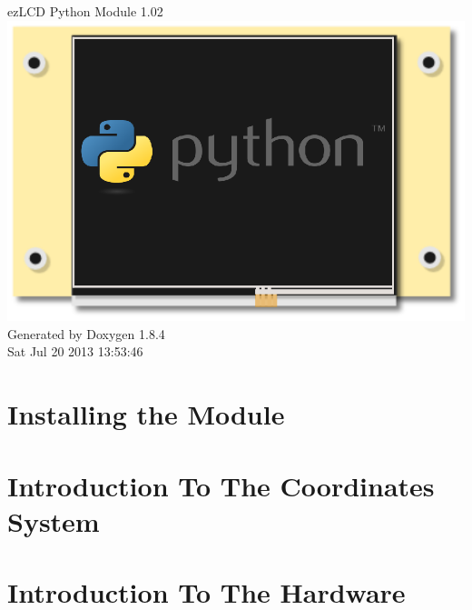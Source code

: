 \documentclass[twoside]{book}
\newcommand{\clearemptydoublepage}{%
  \newpage{\pagestyle{empty}\cleardoublepage}%
}
\begin{document}
\hypersetup{pageanchor=false}
\begin{titlepage}
\vspace*{7cm}
\begin{center}%
{\Large ezLCD Python Module 1.02}\\
\vspace*{1cm}
\includegraphics{ezLCDPython.eps}\\
\vspace*{1cm}
{\large Generated by Doxygen 1.8.4}\\
\vspace*{0.5cm}
{\small Sat Jul 20 2013 13:53:46}\\
\end{center}
\end{titlepage}
\clearemptydoublepage
\tableofcontents
\clearemptydoublepage
{}
\hypersetup{pageanchor=true}

\chapter{Installing the Module}
\label{install}
\hypertarget{install}{}

\chapter{Introduction To The Coordinates System}
\label{coordinatesSystem}
\hypertarget{coordinatesSystem}{}

\chapter{Introduction To The Hardware}
\label{introHardware}
\hypertarget{introHardware}{}

\end{document}
